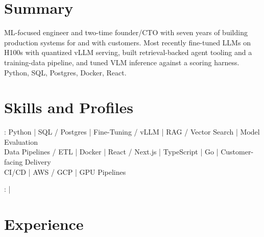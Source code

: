 \documentclass[print]{jack-resume}
\begin{document}
\pagecolor{darkmodeBackground}


\begin{minipage}[t][1cm][t]{.03\textwidth}
    \hfill
\end{minipage}

\section{Summary}
ML-focused engineer and two-time founder/CTO with seven years of building production systems for and with customers. Most recently fine-tuned LLMs on H100s with quantized vLLM serving, built retrieval-backed agent tooling and a training-data pipeline, and tuned VLM inference against a scoring harness. Python, SQL, Postgres, Docker, React.
\sectionsep

\section{Skills and Profiles}
:
Python \hfill | \hfill
SQL / Postgres \hfill | \hfill
Fine-Tuning / vLLM \hfill | \hfill
RAG / Vector Search \hfill | \hfill
Model Evaluation \\
\hspace{1.0cm} Data Pipelines / ETL \hfill | \hfill
Docker \hfill | \hfill
React / Next.js \hfill | \hfill
TypeScript \hfill | \hfill
Go \hfill | \hfill
Customer-facing Delivery \\
\hspace{1.0cm} CI/CD \hfill | \hfill
AWS / GCP \hfill | \hfill
GPU Pipelines \\

\raggedright{
    :
      \href{https://www.linkedin.com/in/jack-sturtevant/}{ \ExternalLink} |
     \href{https://github.com/jacksturt}{ \ExternalLink}}

\section{Experience}
\end{document}
